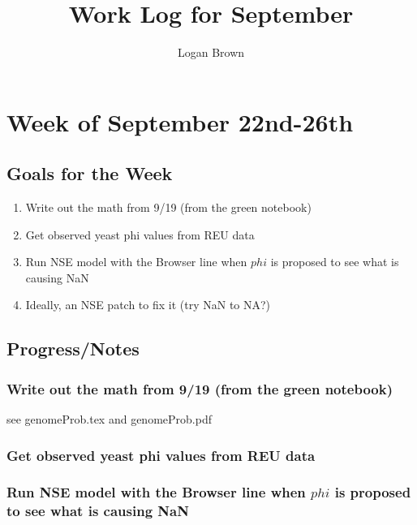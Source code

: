 

\title{Work Log for September}
\author{Logan Brown}


\maketitle


\setcounter{section}{3} %
\setcounter{subsection}{-1}
\setcounter{subsubsection}{0}

\section{Week of September 22nd-26th}
\subsection{Goals for the Week}
\begin{enumerate}
\item Write out the math from 9/19 (from the green notebook)
\item Get observed yeast phi values from REU data
\item Run NSE model with the Browser line when $phi$ is proposed to see what is causing NaN
\item Ideally, an NSE patch to fix it (try NaN to NA?)
\end{enumerate}

\subsection{Progress/Notes}

\subsubsection{Write out the math from 9/19 (from the green notebook)}

see genomeProb.tex and genomeProb.pdf

\subsubsection{Get observed yeast phi values from REU data}

\subsubsection{Run NSE model with the Browser line when $phi$ is proposed to see what is causing NaN}

